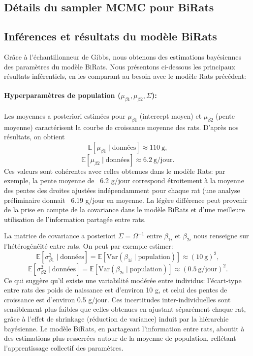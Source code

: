\documentclass[12pt]{article}
\begin{document}
\subsection{Détails du sampler MCMC pour BiRats}
\subsection{Inférences et résultats du modèle BiRats}

Grâce à l’échantillonneur de Gibbs, nous obtenons des estimations bayésiennes des paramètres du modèle BiRats. Nous présentons ci-dessous les principaux résultats inférentiels, en les comparant au besoin avec le modèle Rats précédent:

\paragraph{Hyperparamètres de population ($\mu_{\beta1}, \mu_{\beta2}, \Sigma$):} Les moyennes a posteriori estimées pour $\mu_{\beta1}$ (intercept moyen) et $\mu_{\beta2}$ (pente moyenne) caractérisent la courbe de croissance moyenne des rats. D’après nos résultats, on obtient 
\[ \mathbb{E}[\mu_{\beta1}\mid \text{données}] \approx 110~\text{g}, \] 
\[ \mathbb{E}[\mu_{\beta2}\mid \text{données}] \approx 6.2~\text{g/jour}. \] 
 Ces valeurs sont cohérentes avec celles obtenues dans le modèle Rats: par exemple, la pente moyenne de ~6.2 g/jour correspond étroitement à la moyenne des pentes des droites ajustées indépendamment pour chaque rat (une analyse préliminaire donnait ~6.19 g/jour en moyenne. La légère différence peut provenir de la prise en compte de la covariance dans le modèle BiRats et d’une meilleure utilisation de l’information partagée entre rats.

La matrice de covariance a posteriori $\Sigma = \Omega^{-1}$ entre $\beta_{1i}$ et $\beta_{2i}$ nous renseigne sur l’hétérogénéité entre rats. On peut par exemple estimer:
\[ \mathbb{E}[\sigma_{\beta1}^2 \mid \text{données}] = \mathbb{E}[\mathrm{Var}(\beta_{1i}\mid \text{population})] \approx (10~\text{g})^2, \] 
\[ \mathbb{E}[\sigma_{\beta2}^2 \mid \text{données}] = \mathbb{E}[\mathrm{Var}(\beta_{2i}\mid \text{population})] \approx (0.5~\text{g/jour})^2. \] 
Ce qui suggère qu’il existe une variabilité modérée entre individus: l’écart-type entre rats des poids de naissance est d’environ 10 g, et celui des pentes de croissance est d’environ 0.5 g/jour. Ces incertitudes inter-individuelles sont sensiblement plus faibles que celles obtenues en ajustant séparément chaque rat, grâce à l’effet de \og shrinkage \fg{} (réduction de variance) induit par la hiérarchie bayésienne. Le modèle BiRats, en partageant l’information entre rats, aboutit à des estimations plus resserrées autour de la moyenne de population, reflétant l’apprentissage collectif des paramètres.
\end{document}
